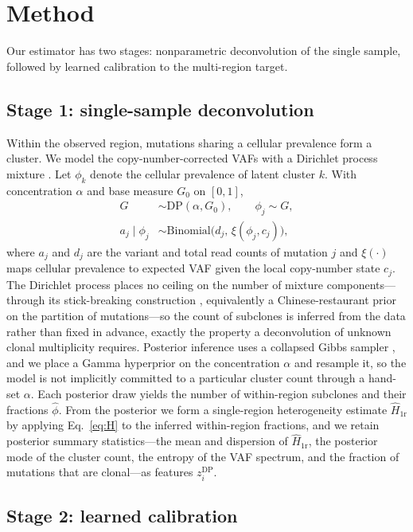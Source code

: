 \documentclass{article}
\begin{document}
\section{Method}

Our estimator has two stages: nonparametric deconvolution of the single sample,
followed by learned calibration to the multi-region target.

\subsection{Stage 1: single-sample deconvolution}

Within the observed region, mutations sharing a cellular prevalence form a cluster.
We model the copy-number-corrected VAFs with a Dirichlet process mixture
\citep{Escobar1995,Roth2014}. Let $\phi_k$ denote the cellular prevalence of latent
cluster $k$. With concentration $\alpha$ and base measure $G_0$ on $[0,1]$,
\begin{align}
G &\sim \mathrm{DP}(\alpha, G_0), \qquad \phi_j \sim G, \nonumber\\
a_j \mid \phi_j &\sim \mathrm{Binomial}\big(d_j,\, \xi(\phi_j, c_j)\big),
\end{align}
where $a_j$ and $d_j$ are the variant and total read counts of mutation $j$ and
$\xi(\cdot)$ maps cellular prevalence to expected VAF given the local copy-number
state $c_j$. The Dirichlet process places no ceiling on the number of mixture
components---through its stick-breaking construction \citep{Sethuraman1994},
equivalently a Chinese-restaurant prior on the partition of mutations---so the count
of subclones is inferred from the data rather than fixed in advance, exactly the
property a deconvolution of unknown clonal multiplicity requires. Posterior inference
uses a collapsed Gibbs sampler \citep{Neal2000}, and we place a Gamma hyperprior on the
concentration $\alpha$ and resample it, so the model is not implicitly committed to a
particular cluster count through a hand-set $\alpha$. Each posterior draw yields the
number of within-region subclones and their fractions $\hat\phi$. From the posterior we form
a single-region heterogeneity estimate $\hat H_{\text{1r}}$ by applying
Eq.~\eqref{eq:H} to the inferred within-region fractions, and we retain posterior
summary statistics---the mean and dispersion of $\hat H_{\text{1r}}$, the posterior
mode of the cluster count, the entropy of the VAF spectrum, and the fraction of
mutations that are clonal---as features $z^{\text{DP}}_i$.

\subsection{Stage 2: learned calibration}
\end{document}
